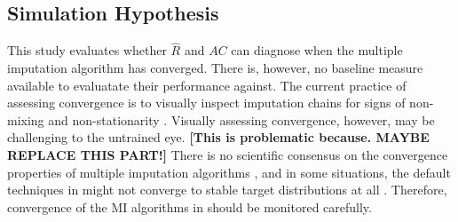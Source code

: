 \documentclass[article]{jss}
\begin{document}


\subsection{Simulation Hypothesis} \label{sec:hypothesis}

This study evaluates whether $\widehat{R}$ and $AC$ can diagnose when the multiple imputation algorithm has converged. There is, however, no baseline measure available to evaluatate their performance against. The current practice of assessing convergence is to visually inspect imputation chains for signs of non-mixing and non-stationarity \citep[\S~6.5.2]{buur18}. Visually assessing convergence, however, may be challenging to the untrained eye. \textbf{[This is problematic because. MAYBE REPLACE THIS PART!]} There is no scientific consensus on the convergence properties of multiple imputation algorithms \citep{taka17}, and in some situations, the default techniques in  might not converge to stable target distributions at all \citep{murr18}. %
Therefore, convergence of the MI algorithms in  should be monitored carefully. %
\end{document}
